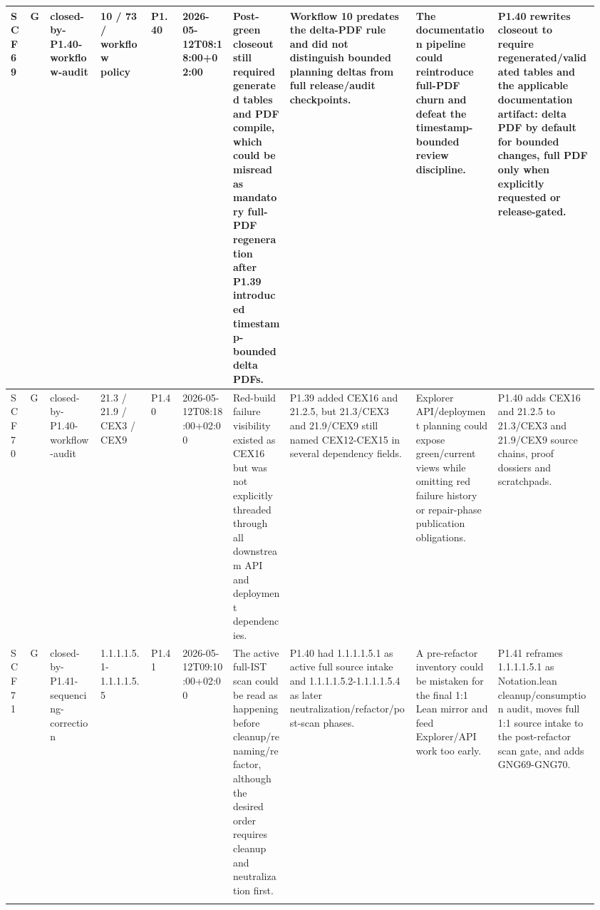 \begin{longtable}{L{0.03\linewidth} L{0.026\linewidth} L{0.087\linewidth} L{0.085\linewidth} L{0.052\linewidth} L{0.085\linewidth} L{0.095\linewidth} L{0.205\linewidth} L{0.13\linewidth} L{0.165\linewidth}}
SCF69 & G & closed-by-P1.40-workflow-audit & 10 /\allowbreak{} 73 /\allowbreak{} workflow policy & P1.40 & 2026-05-12T08:18:00+02:00 & Post-green closeout still required generated tables and PDF compile, which could be misread as mandatory full-PDF regeneration after P1.39 introduced timestamp-bounded delta PDFs. & Workflow 10 predates the delta-PDF rule and did not distinguish bounded planning deltas from full release/\allowbreak{}audit checkpoints. & The documentation pipeline could reintroduce full-PDF churn and defeat the timestamp-bounded review discipline. & P1.40 rewrites closeout to require regenerated/\allowbreak{}validated tables and the applicable documentation artifact: delta PDF by default for bounded changes, full PDF only when explicitly requested or release-gated.\\
\hline
\addlinespace[0.24em]
SCF70 & G & closed-by-P1.40-workflow-audit & 21.3 /\allowbreak{} 21.9 /\allowbreak{} CEX3 /\allowbreak{} CEX9 & P1.40 & 2026-05-12T08:18:00+02:00 & Red-build failure visibility existed as CEX16 but was not explicitly threaded through all downstream API and deployment dependencies. & P1.39 added CEX16 and 21.2.5, but 21.3/\allowbreak{}CEX3 and 21.9/\allowbreak{}CEX9 still named CEX12-CEX15 in several dependency fields. & Explorer API/\allowbreak{}deployment planning could expose green/\allowbreak{}current views while omitting red failure history or repair-phase publication obligations. & P1.40 adds CEX16 and 21.2.5 to 21.3/\allowbreak{}CEX3 and 21.9/\allowbreak{}CEX9 source chains, proof dossiers and scratchpads.\\
\hline
\addlinespace[0.24em]
SCF71 & G & closed-by-P1.41-sequencing-correction & 1.1.1.1.5.1-1.1.1.1.5.5 & P1.41 & 2026-05-12T09:10:00+02:00 & The active full-IST scan could be read as happening before cleanup/\allowbreak{}renaming/\allowbreak{}refactor, although the desired order requires cleanup and neutralization first. & P1.40 had 1.1.1.1.5.1 as active full source intake and 1.1.1.1.5.2-1.1.1.1.5.4 as later neutralization/\allowbreak{}refactor/\allowbreak{}post-scan phases. & A pre-refactor inventory could be mistaken for the final 1:1 Lean mirror and feed Explorer/\allowbreak{}API work too early. & P1.41 reframes 1.1.1.1.5.1 as Notation.lean cleanup/\allowbreak{}consumption audit, moves full 1:1 source intake to the post-refactor scan gate, and adds GNG69-GNG70.\\
\hline
\addlinespace[0.24em]

\end{longtable}
